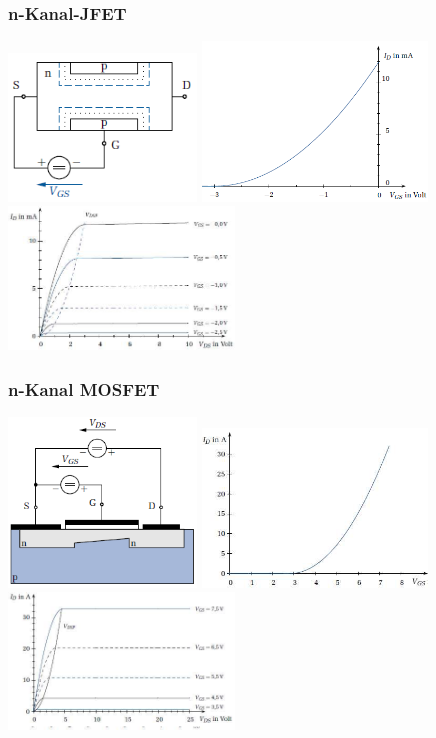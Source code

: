 \subsubsection{n-Kanal-JFET}
\includegraphics[width=5cm]{images/jFET}
\includegraphics[width=6cm]{images/jFetSteuerKennlinie}
\includegraphics[width=6cm]{images/jFetAusgangsKennlinie}\\

\subsubsection{n-Kanal MOSFET}

\includegraphics[width=5cm]{images/MOSFET}
\includegraphics[width=6cm]{images/MOSFETSteuerKennlinie}
\includegraphics[width=6cm]{images/MOSFETAusgangsKennlinie}\\